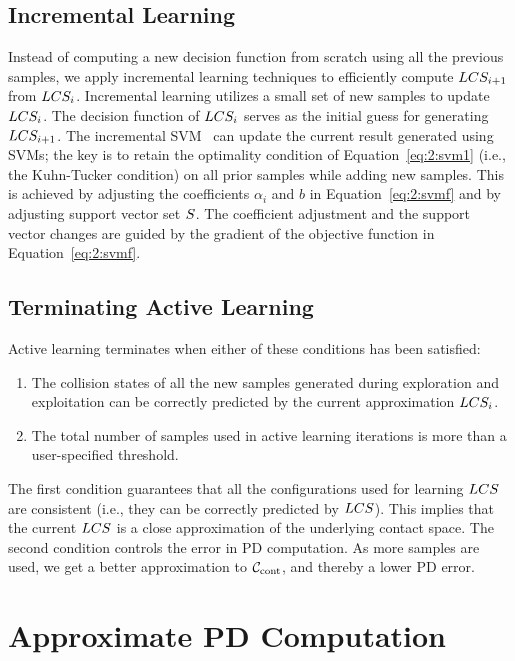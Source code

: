 \subsection{Incremental Learning}
\label{sec:2:incremental_learning}
Instead of computing a new decision function
from scratch using all the previous samples, we apply incremental
learning techniques to efficiently compute $LCS_{i+1}$ from
$LCS_i$. Incremental learning utilizes a small set
of new samples to update $LCS_i$. The decision function of $LCS_i$
serves as the initial guess for generating $LCS_{i+1}$. The incremental SVM~\cite{Karasuyama:2009:MID} can update
the current result generated using SVMs; the key is to retain the optimality condition of Equation~\ref{eq:2:svm1} (i.e., the Kuhn-Tucker condition) on all prior samples while adding new samples. This is achieved by adjusting the coefficients $\alpha_i$ and $b$ in Equation~\ref{eq:2:svmf} and by adjusting support vector set $S$. The coefficient adjustment and the support vector changes are guided by the gradient of the objective function in Equation~\ref{eq:2:svmf}.

\subsection{Terminating Active Learning}
Active learning terminates when either of these conditions has been satisfied:
\begin{enumerate}
    \item The collision states of all the new samples generated during
exploration and exploitation can be correctly predicted by the
current approximation $LCS_i$.
    \item The total number of samples used in active learning iterations is more than a user-specified threshold.
   \end{enumerate}
The first condition guarantees that all the configurations used for learning $LCS$ are consistent (i.e., they can be correctly predicted by $LCS$). This implies that the current $LCS$ is a close approximation of the underlying contact space.
The second condition controls the error in PD computation. As more samples are used, we get a better approximation to $\mathcal C_\text{cont}$, and thereby a lower PD error.


\section{Approximate PD Computation}
\label{sec:2:approxPD}

